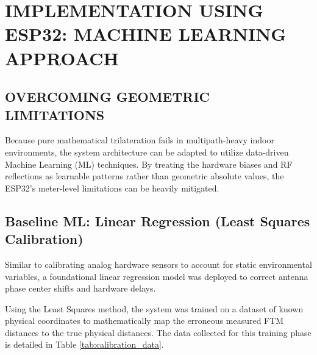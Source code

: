 \documentclass[conference]{IEEEtran}
\begin{document}
\section{IMPLEMENTATION USING ESP32: MACHINE LEARNING APPROACH}

\subsection{OVERCOMING GEOMETRIC LIMITATIONS}
Because pure mathematical trilateration fails in multipath-heavy indoor environments, the system architecture can be adapted to utilize data-driven Machine Learning (ML) techniques. By treating the hardware biases and RF reflections as learnable patterns rather than geometric absolute values, the ESP32's meter-level limitations can be heavily mitigated.

\subsection{Baseline ML: Linear Regression (Least Squares Calibration)}
Similar to calibrating analog hardware sensors to account for static environmental variables, a foundational linear regression model was deployed to correct antenna phase center shifts and hardware delays. 

Using the Least Squares method, the system was trained on a dataset of known physical coordinates to mathematically map the erroneous measured FTM distances to the true physical distances. The data collected for this training phase is detailed in Table \ref{tab:calibration_data}.
\end{document}
